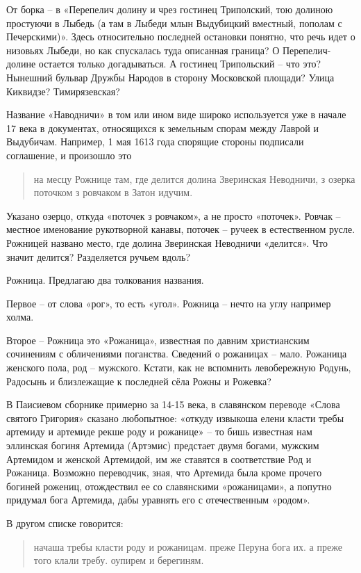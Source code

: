 От борка – в «Перепелич долину и чрез гостинец Триполский, тою долиною простуючи в Лыбедь (а там в Лыбеди млын Выдубицкий вместный, пополам с Печерскими)». Здесь относительно последней остановки понятно, что речь идет о низовьях Лыбеди, но как спускалась туда описанная граница? О Перепелич-долине остается только догадываться. А гостинец Трипольский – что это? Нынешний бульвар Дружбы Народов в сторону Московской площади? Улица Киквидзе? Тимирязевская?

Название «Наводничи» в том или ином виде широко используется уже в начале 17 века в документах, относящихся к земельным спорам между Лаврой и Выдубичам. Например, 1 мая 1613 года спорящие стороны подписали соглашение, и произошло это

\begin{quotation}
на месцу Рожнице там, где делится долина Зверинская Неводничи, з озерка поточком з ровчаком в Затон идучим.
\end{quotation} 

Указано озерцо, откуда «поточек з ровчаком», а не просто «поточек». Ровчак – местное именование рукотворной канавы, поточек – ручеек в естественном русле. Рожницей названо место, где долина Зверинская Неводничи «делится». Что значит делится? Разделяется ручьем вдоль?

Рожница. Предлагаю два толкования названия.

Первое – от слова «рог», то есть «угол». Рожница – нечто на углу например холма.

Второе – Рожница это «Рожаница», известная по давним христианским сочинениям с обличениями поганства. Сведений о рожаницах – мало. Рожаница женского пола, род – мужского. Кстати, как не вспомнить левобережную Родунь, Радосынь и близлежащие к последней сёла Рожны и Рожевка?

В Паисиевом сборнике примерно за 14-15 века, в славянском переводе «Слова святого Григория» сказано любопытное: «откуду извыкоша елени класти требы артемиду и артемиде рекше роду и рожанице» – то бишь известная нам эллинская богиня Артемида (Артэмис) предстает двумя богами, мужским Артемидом и женской Артемидой, им же ставятся в соответствие Род и Рожаница. Возможно переводчик, зная, что Артемида была кроме прочего богиней рожениц, отождествил ее со славянскими «рожаницами», а попутно придумал бога Артемида, дабы уравнять его с отечественным «родом».

В другом списке говорится: 

\begin{quotation}
начаша требы класти роду и рожаницам. преже Перуна бога их. а преже того клали требу. оупирем и берегиням.
\end{quotation}


